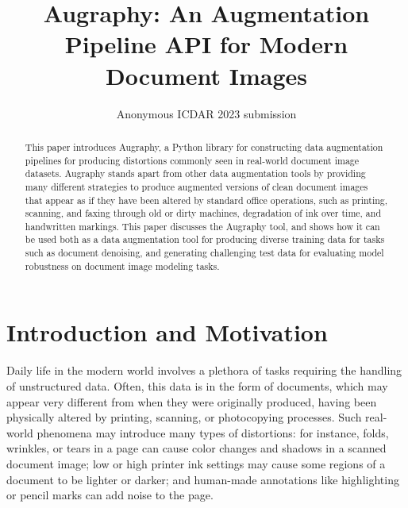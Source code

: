 \documentclass[runningheads]{llncs}
\begin{document}
\title{Augraphy: An Augmentation Pipeline API for Modern Document Images}
%
%

\author{Anonymous ICDAR 2023 submission}

\maketitle

\begin{abstract}
This paper introduces Augraphy, a Python library for constructing data augmentation pipelines for producing distortions commonly seen in real-world document image datasets.
Augraphy stands apart from other data augmentation tools by providing many different strategies to produce augmented versions of clean document images that appear as if they have been altered by standard office operations, such as printing, scanning, and faxing through old or dirty machines, degradation of ink over time, and handwritten markings.
This paper discusses the Augraphy tool, and shows how it can be used both as a data augmentation tool for producing diverse training data for tasks such as document denoising, and generating challenging test data for evaluating model robustness on document image modeling tasks.

\end{abstract}

\section{Introduction and Motivation}
Daily life in the modern world involves a plethora of tasks requiring the handling of unstructured data.
Often, this data is in the form of documents, which may appear very different from when they were originally produced, having been physically altered by printing, scanning, or photocopying processes.
Such real-world phenomena may introduce many types of distortions: for instance, folds, wrinkles, or tears in a page can cause color changes and shadows in a scanned document image; low or high printer ink settings may cause some regions of a document to be lighter or darker; and human-made annotations like highlighting or pencil marks can add noise to the page.
\end{document}
